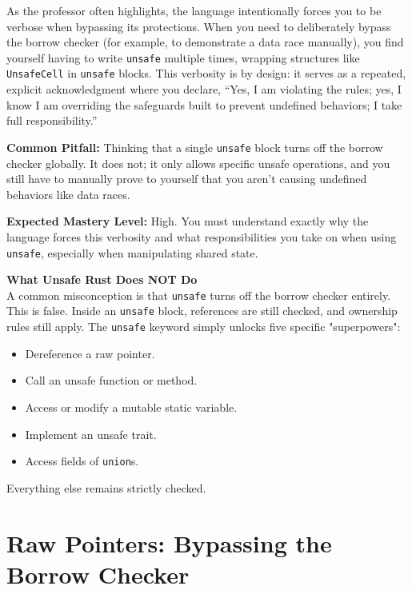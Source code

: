 \begin{examprioritybox}
As the professor often highlights, the language intentionally forces you to be verbose when bypassing its protections. When you need to deliberately bypass the borrow checker (for example, to demonstrate a data race manually), you find yourself having to write \texttt{unsafe} multiple times, wrapping structures like \texttt{UnsafeCell} in \texttt{unsafe} blocks. This verbosity is by design: it serves as a repeated, explicit acknowledgment where you declare, ``Yes, I am violating the rules; yes, I know I am overriding the safeguards built to prevent undefined behaviors; I take full responsibility.''

\textbf{Common Pitfall:} Thinking that a single \texttt{unsafe} block turns off the borrow checker globally. It does not; it only allows specific unsafe operations, and you still have to manually prove to yourself that you aren't causing undefined behaviors like data races.

\textbf{Expected Mastery Level:} High. You must understand exactly why the language forces this verbosity and what responsibilities you take on when using \texttt{unsafe}, especially when manipulating shared state.
\end{examprioritybox}

\begin{insightbox}
\textbf{What Unsafe Rust Does NOT Do}\\
A common misconception is that \texttt{unsafe} turns off the borrow checker entirely. This is false. Inside an \texttt{unsafe} block, references are still checked, and ownership rules still apply. The \texttt{unsafe} keyword simply unlocks five specific "superpowers":
\begin{itemize}
    \item Dereference a raw pointer.
    \item Call an unsafe function or method.
    \item Access or modify a mutable static variable.
    \item Implement an unsafe trait.
    \item Access fields of \texttt{union}s.
\end{itemize}
Everything else remains strictly checked.
\end{insightbox}

\section{Raw Pointers: Bypassing the Borrow Checker}

